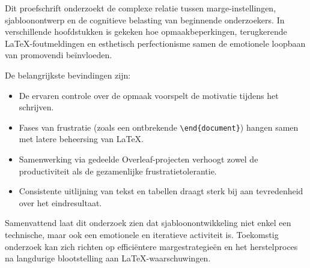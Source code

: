 Dit proefschrift onderzoekt de complexe relatie tussen marge-instellingen,
sjabloonontwerp en de cognitieve belasting van beginnende onderzoekers.
In verschillende hoofdstukken is gekeken hoe opmaakbeperkingen,
terugkerende LaTeX-foutmeldingen en esthetisch perfectionisme samen
de emotionele loopbaan van promovendi beïnvloeden.

\vspace{1em}
De belangrijkste bevindingen zijn:
\begin{itemize}
  \item De ervaren controle over de opmaak voorspelt de motivatie tijdens het schrijven.
  \item Fases van frustratie (zoals een ontbrekende \texttt{\textbackslash end\{document\}}) hangen samen met latere beheersing van LaTeX.
  \item Samenwerking via gedeelde Overleaf-projecten verhoogt zowel de productiviteit als de gezamenlijke frustratietolerantie.
  \item Consistente uitlijning van tekst en tabellen draagt sterk bij aan tevredenheid over het eindresultaat.
\end{itemize}

Samenvattend laat dit onderzoek zien dat sjabloonontwikkeling niet enkel
een technische, maar ook een emotionele en iteratieve activiteit is.
Toekomstig onderzoek kan zich richten op efficiëntere margestrategieën
en het herstelproces na langdurige blootstelling aan LaTeX-waarschuwingen.